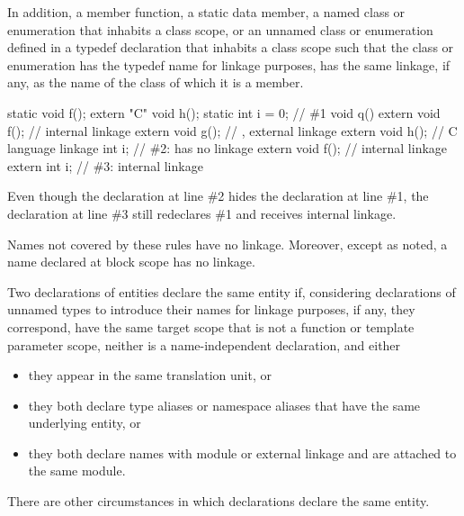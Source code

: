\pnum
In addition,
a member function,
a static data member,
a named class or enumeration that inhabits a class scope, or
an unnamed class or enumeration defined in a typedef declaration
that inhabits a class scope
such that the class or enumeration
has the typedef name for linkage purposes,
has the same linkage, if any, as the name of the class of which it is a member.

\pnum
\begin{example}
\begin{codeblock}
static void f();
extern "C" void h();
static int i = 0;               // \#1
void q() {
  extern void f();              // internal linkage
  extern void g();              // , external linkage
  extern void h();              // C language linkage
  int i;                        // \#2:  has no linkage
  {
    extern void f();            // internal linkage
    extern int i;               // \#3: internal linkage
  }
}
\end{codeblock}
Even though the declaration at line \#2 hides the declaration at line \#1,
the declaration at line \#3 still redeclares \#1 and receives internal linkage.
\end{example}

\pnum
{}%
Names not covered by these rules have no linkage. Moreover, except as
noted, a name declared at block scope has no
linkage.

\pnum
Two declarations of entities declare the same entity
if, considering declarations of unnamed types to introduce their names
for linkage purposes, if any,
they correspond,
have the same target scope that is not a function or template parameter scope,
neither is a name-independent declaration,
and either
\begin{itemize}
\item
they appear in the same translation unit, or
\item
they both declare type aliases or namespace aliases that have the same underlying entity, or
\item
they both declare names with module or external linkage and are attached to the same module.
\end{itemize}
\begin{note}
There are other circumstances in which declarations declare
the same entity.
\end{note}


